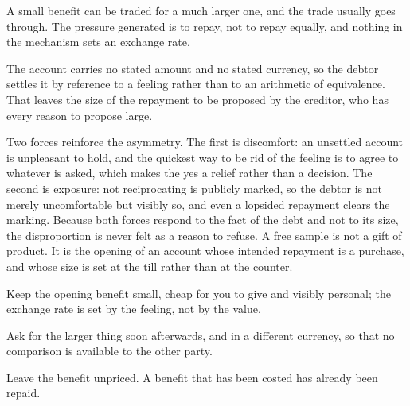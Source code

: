 


\begin{core}
A small benefit can be traded for a much larger one, and the trade usually goes through. The pressure generated is to repay, not to repay equally, and nothing in the mechanism sets an exchange rate.
\end{core}

\begin{mechanism}
The account carries no stated amount and no stated currency, so the debtor settles it by reference to a feeling rather than to an arithmetic of equivalence. That leaves the size of the repayment to be proposed by the creditor, who has every reason to propose large.

Two forces reinforce the asymmetry. The first is discomfort: an unsettled account is unpleasant to hold, and the quickest way to be rid of the feeling is to agree to whatever is asked, which makes the yes a relief rather than a decision. The second is exposure: not reciprocating is publicly marked, so the debtor is not merely uncomfortable but visibly so, and even a lopsided repayment clears the marking. Because both forces respond to the fact of the debt and not to its size, the disproportion is never felt as a reason to refuse.
A free sample is not a gift of product. It is the opening of an account whose intended repayment is a purchase, and whose size is set at the till rather than at the counter.
\end{mechanism}


\begin{application}
  \item Keep the opening benefit small, cheap for you to give and visibly personal; the exchange rate is set by the feeling, not by the value.
  \item Ask for the larger thing soon afterwards, and in a different currency, so that no comparison is available to the other party.
  \item Leave the benefit unpriced. A benefit that has been costed has already been repaid.
\end{application}

